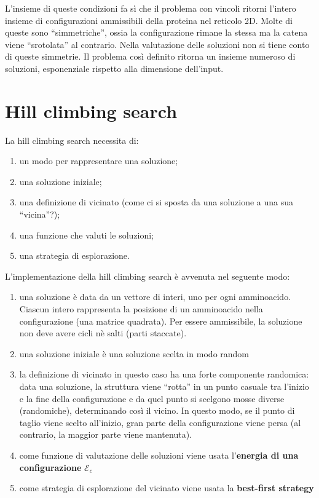 \documentclass[twocolumn,10pt]{asme2ej}
\begin{document}
L'insieme di queste condizioni fa sì che il problema con vincoli ritorni l'intero insieme di configurazioni ammissibili della proteina nel reticolo 2D. Molte di queste sono ``simmetriche'', ossia la configurazione rimane la stessa ma la catena viene ``srotolata'' al contrario. Nella valutazione delle soluzioni non si tiene conto di queste simmetrie. Il problema così definito ritorna un insieme numeroso di soluzioni, esponenziale rispetto alla dimensione dell'input.

\section{Hill climbing search}

La hill climbing search necessita di:

\begin{enumerate}
 \item un modo per rappresentare una soluzione;
 \item una soluzione iniziale;
 \item una definizione di vicinato (come ci si sposta da una soluzione a una sua ``vicina''?);
 \item una funzione che valuti le soluzioni;
 \item una strategia di esplorazione.
\end{enumerate}

L'implementazione della hill climbing search è avvenuta nel seguente modo:

\begin{enumerate}
 \item una soluzione è data da un vettore di interi, uno per ogni amminoacido. Ciascun intero rappresenta la posizione di un amminoacido nella configurazione (una matrice quadrata). Per essere ammissibile, la soluzione non deve avere cicli nè salti (parti staccate).
 \item una soluzione iniziale è una soluzione scelta in modo random
 \item la definizione di vicinato in questo caso ha una forte componente randomica: data una soluzione, la struttura viene ``rotta'' in un punto casuale tra l'inizio e la fine della configurazione e da quel punto si scelgono mosse diverse (randomiche), determinando così il vicino. In questo modo, se il punto di taglio viene scelto all'inizio, gran parte della configurazione viene persa (al contrario, la maggior parte viene mantenuta).
 \item come funzione di valutazione delle soluzioni viene usata l'\textbf{energia di una configurazione} $\mathcal{E}_c$
 \item come strategia di esplorazione del vicinato viene usata la \textbf{best-first strategy}
\end{enumerate}
\end{document}

